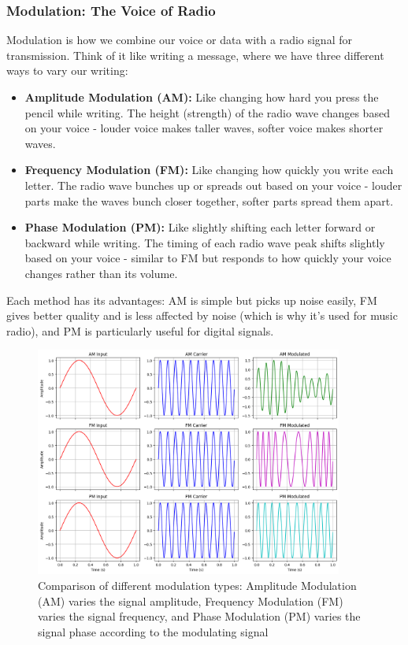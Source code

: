 \subsubsection*{Modulation: The Voice of Radio}
Modulation is how we combine our voice or data with a radio signal for transmission. Think of it like writing a message, where we have three different ways to vary our writing:

\begin{itemize}[noitemsep]
    \item \textbf{Amplitude Modulation (AM):} Like changing how hard you press the pencil while writing. The height (strength) of the radio wave changes based on your voice - louder voice makes taller waves, softer voice makes shorter waves.
    
    \item \textbf{Frequency Modulation (FM):} Like changing how quickly you write each letter. The radio wave bunches up or spreads out based on your voice - louder parts make the waves bunch closer together, softer parts spread them apart.
    
    \item \textbf{Phase Modulation (PM):} Like slightly shifting each letter forward or backward while writing. The timing of each radio wave peak shifts slightly based on your voice - similar to FM but responds to how quickly your voice changes rather than its volume.
\end{itemize}

Each method has its advantages: AM is simple but picks up noise easily, FM gives better quality and is less affected by noise (which is why it's used for music radio), and PM is particularly useful for digital signals.

\begin{figure}[h!]
    \centering
    \includegraphics[width=0.9\textwidth]{images/modulations.png}
    \caption{Comparison of different modulation types: Amplitude Modulation (AM) varies the signal amplitude,  Frequency Modulation (FM) varies the signal frequency, and  Phase Modulation (PM) varies the signal phase according to the modulating signal}
    \label{fig:modulation-comparison}
\end{figure}


